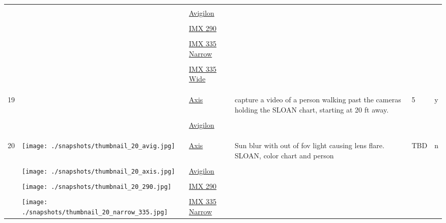 \documentclass{article}%
\begin{document}
\begin{longtabu}{m{2.5cm} m{4cm} m{2cm} m{4cm} m{2cm} m{2cm}}
&&&&&\\%
&&\href{https://drive.google.com/file/d/1OywqjIYjO_kEUzADYp8ODwSJU42vIUKa/view?usp=sharing}{Avigilon}&&&\\%
&&&&&\\%
&&\href{https://drive.google.com/file/d/1xw8-j5XMFpHrmmgqRJWLaH_MTbIJynsM/view?usp=sharing}{IMX 290}&&&\\%
&&&&&\\%
&&\href{https://drive.google.com/file/d/123eAd0QZEYJkwz5BLVYMnf2XIcjvjSqu/view?usp=sharing}{IMX 335 Narrow}&&&\\%
&&&&&\\%
&&\href{https://drive.google.com/file/d/19FsABopyxSEJf3R0DRr9M0eB_Higvrx8/view?usp=sharing}{IMX 335 Wide}&&&\\%
&&&&&\\%
&&&&&\\%
\hline%
&&&&&\\%
19&&\href{https://drive.google.com/file/d/1Zsq4BGwbMqnAeRSK4DBlUA9IABht-zWo/view?usp=sharing}{Axis}&capture a video of a person walking past the cameras holding the SLOAN chart, starting at 20 ft away.&5&y\\%
&&&&&\\%
&&\href{https://drive.google.com/file/d/1-_9hxo8BSkV0xmBZ1IfSC1LZfXQmlpBH/view?usp=sharing}{Avigilon}&&&\\%
&&&&&\\%
&&&&&\\%
\hline%
&&&&&\\%
20&\texttt{[image: ./snapshots/thumbnail\_20\_avig.jpg]}&\href{https://drive.google.com/file/d/1rIddRHhGBJceb1k1WUb0s-CTgygJIsib/view?usp=sharing}{Axis}&Sun blur with out of fov light causing lens flare. SLOAN, color chart and person&TBD&n\\%
&&&&&\\%
&\texttt{[image: ./snapshots/thumbnail\_20\_axis.jpg]}&\href{https://drive.google.com/file/d/1HiSFFiDk0aBlTIsgzqjKtNF9Rld1GdOZ/view?usp=sharing}{Avigilon}&&&\\%
&&&&&\\%
&\texttt{[image: ./snapshots/thumbnail\_20\_290.jpg]}&\href{https://drive.google.com/file/d/1VBHlOWv-GOlVb70PupBpk6_Ek_WCqH9P/view?usp=sharing}{IMX 290}&&&\\%
&&&&&\\%
&\texttt{[image: ./snapshots/thumbnail\_20\_narrow\_335.jpg]}&\href{https://drive.google.com/file/d/1cZXnKYMv8vde1DIeLRlZQZDAofM7X-2r/view?usp=sharing}{IMX 335 Narrow}&&&\\%

\end{longtabu}
\end{document}
